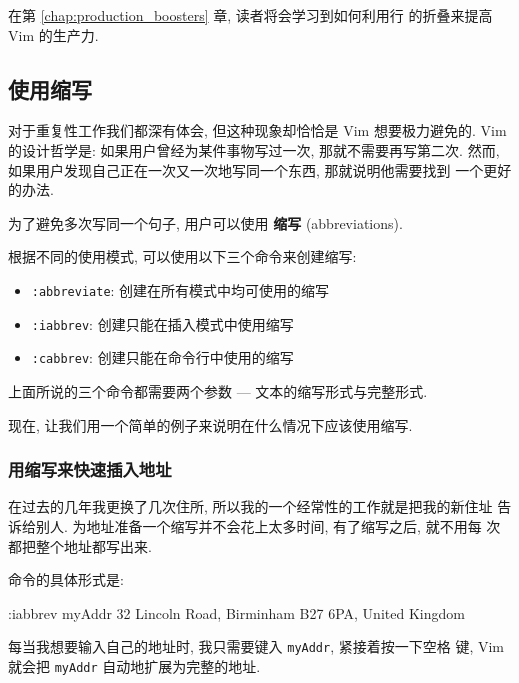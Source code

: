 \begin{warning}
    在第 \ref{chap:production_boosters} 章, 读者将会学习到如何利用行
    的折叠来提高 Vim 的生产力.
\end{warning}

\subsection{使用缩写}
\label{subsec:using_abbreviations}

对于重复性工作我们都深有体会, 但这种现象却恰恰是 Vim 想要极力避免的.
Vim 的设计哲学是: 如果用户曾经为某件事物写过一次, 那就不需要再写第二次.
然而, 如果用户发现自己正在一次又一次地写同一个东西, 那就说明他需要找到
一个更好的办法.

为了避免多次写同一个句子, 用户可以使用 \textbf{缩写} (abbreviations).

根据不同的使用模式, 可以使用以下三个命令来创建缩写:
\begin{itemize}
    \item \texttt{:abbreviate}: 创建在所有模式中均可使用的缩写
    \item \texttt{:iabbrev}: 创建只能在插入模式中使用缩写
    \item \texttt{:cabbrev}: 创建只能在命令行中使用的缩写
\end{itemize}

上面所说的三个命令都需要两个参数 --- 文本的缩写形式与完整形式.

现在, 让我们用一个简单的例子来说明在什么情况下应该使用缩写.

\subsubsection{用缩写来快速插入地址}
\label{subsubsec:using_abbreviations_for_quick_address_insertion}
在过去的几年我更换了几次住所, 所以我的一个经常性的工作就是把我的新住址
告诉给别人. 为地址准备一个缩写并不会花上太多时间, 有了缩写之后, 就不用每
次都把整个地址都写出来.

命令的具体形式是:
\begin{vimcmd}
:iabbrev myAddr 32 Lincoln Road, Birminham B27 6PA, United Kingdom
\end{vimcmd}
每当我想要输入自己的地址时, 我只需要键入 \texttt{myAddr}, 紧接着按一下空格
键, Vim 就会把 \texttt{myAddr} 自动地扩展为完整的地址.

